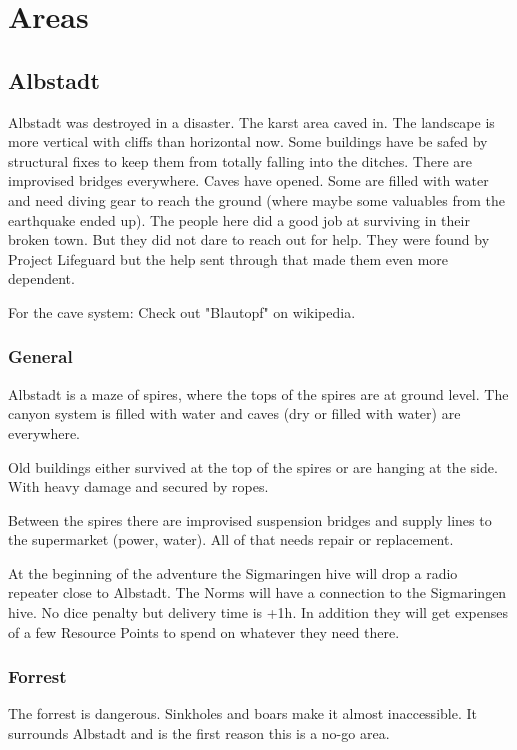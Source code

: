 \section{Areas}

\subsection{Albstadt}

Albstadt was destroyed in a disaster. The karst area caved in. The landscape is more vertical with cliffs than horizontal now. Some buildings have be safed by structural fixes to keep them from totally falling into the ditches. There are improvised bridges everywhere. Caves have opened. Some are filled with water and need diving gear to reach the ground (where maybe some valuables from the earthquake ended up).
The people here did a good job at surviving in their broken town. But they did not dare to reach out for help. They were found by Project Lifeguard but the help sent through that made them even more dependent.

For the cave system: Check out "Blautopf" on wikipedia. 

\subsubsection{General}

Albstadt is a maze of spires, where the tops of the spires are at ground level. The canyon system is filled with water and caves (dry or filled with water) are everywhere.

Old buildings either survived at the top of the spires or are hanging at the side. With heavy damage and secured by ropes.

Between the spires there are improvised suspension bridges and supply lines to the supermarket (power, water). All of that needs repair or replacement.

At the beginning of the adventure the Sigmaringen hive will drop a radio repeater close to Albstadt. The Norms will have a connection to the Sigmaringen hive. No dice penalty but delivery time is +1h.
In addition they will get expenses of a few Resource Points to spend on whatever they need there.

\subsubsection{Forrest}

The forrest is dangerous. Sinkholes and boars make it almost inaccessible. It surrounds Albstadt and is the first reason this is a no-go area.

